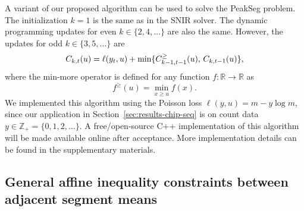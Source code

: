 \documentclass{article}
\newcommand{\ZZ}{\mathbb Z}
\newcommand{\RR}{\mathbb R}
\begin{document}
A variant of our proposed algorithm can be used to solve the PeakSeg
problem. The initialization $k=1$ is the same as in the SNIR
solver. The dynamic programming updates for even $k\in\{2, 4, \dots\}$
are also the same. However, the updates for odd $k\in\{3, 5, \dots\}$
are
\begin{equation}
  C_{k,t}(u) = \ell(y_t, u) + \min\{
  C_{k-1,t-1}^\geq(u),\, C_{k,t-1}(u)
  \},
\end{equation}
where the min-more operator is defined for any function $f:\RR\rightarrow\RR$ as
\begin{equation}
  \label{eq:min-more-def}
  f^\geq(u) = \min_{x\geq u} f(x).
\end{equation}
We implemented this algorithm using the Poisson loss
$\ell(y, u) = m - y\log m$, since our application in
Section~\ref{sec:results-chip-seq} is on count data
$y\in\ZZ_+ = \{0, 1, 2, \dots\}$.
A free/open-source C++ implementation of this algorithm will be made
available online after acceptance. More implementation details can be
found in the supplementary materials.

\subsection{General affine inequality constraints
  between adjacent segment means}



\end{document}
